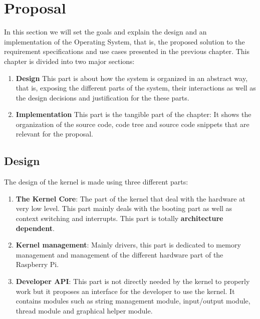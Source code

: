 \chapter{Proposal}

In this section we will set the goals and explain the design and an implementation of the Operating System, that is, the proposed solution to the requirement specifications and use cases presented in the previous chapter. This chapter is divided into two major sections:
\begin{enumerate}
	\item \textbf{Design} This part is about how the system is organized in an abstract way, that is, exposing the different parts of the system, their interactions as well as the design decisions and justification for the these parts.
	\item \textbf{Implementation} This part is the tangible part of the chapter: It shows the organization of the source code, code tree and source code snippets that are relevant for the proposal.
\end{enumerate}

\section{Design}

The design of the kernel is made using three different parts:
\begin{enumerate}
	\item \textbf{The Kernel Core}: The part of the kernel that deal with the hardware at very low level. This part mainly deals with the booting part as well as context switching and interrupts. This part is totally \textbf{architecture dependent}.
	\item \textbf{Kernel management}: Mainly drivers, this part is dedicated to memory management and management of the different hardware part of the Raspberry Pi.
	\item \textbf{Developer API}: This part is not directly needed by the kernel to properly work but it proposes an interface for the developer to use the kernel. It contains modules such as string management module, input/output module, thread module and graphical helper module.
\end{enumerate}


